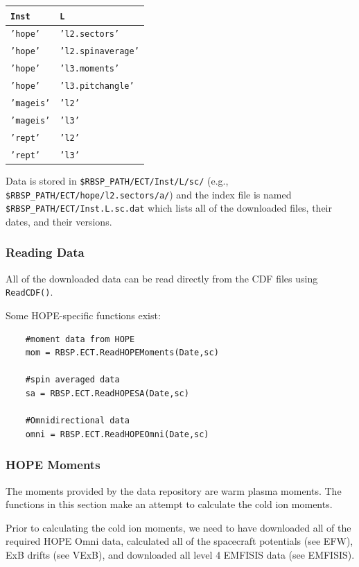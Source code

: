 	\begin{tabular}{|l|l|}
	\hline
	\texttt{Inst} & \texttt{L} \\
	\hline
	\texttt{'hope'} & \texttt{'l2.sectors'} \\
	\texttt{'hope'} & \texttt{'l2.spinaverage'} \\
	\texttt{'hope'} & \texttt{'l3.moments'} \\
	\texttt{'hope'} & \texttt{'l3.pitchangle'} \\
	\texttt{'mageis'} & \texttt{'l2'} \\
	\texttt{'mageis'} & \texttt{'l3'} \\
	\texttt{'rept'} & \texttt{'l2'} \\
	\texttt{'rept'} & \texttt{'l3'} \\
	\hline
	\end{tabular}
	
	Data is stored in \texttt{\$RBSP\_PATH/ECT/Inst/L/sc/} (e.g., \texttt{\$RBSP\_PATH/ECT/hope/l2.sectors/a/}) and the index file is named \texttt{\$RBSP\_PATH/ECT/Inst.L.sc.dat} which lists all of the downloaded files, their dates, and their versions.
	
	\subsubsection{Reading Data}
	
	All of the downloaded data can be read directly from the CDF files using \texttt{ReadCDF()}.
	
	Some HOPE-specific functions exist:
	
	\begin{verbatim}
	#moment data from HOPE
	mom = RBSP.ECT.ReadHOPEMoments(Date,sc)
	
	#spin averaged data
	sa = RBSP.ECT.ReadHOPESA(Date,sc)
	
	#Omnidirectional data
	omni = RBSP.ECT.ReadHOPEOmni(Date,sc)
	\end{verbatim}
	
	\subsubsection{HOPE Moments}
	
	The moments provided by the data repository are warm plasma moments. The functions in this section make an attempt to calculate the cold ion moments.
	
	Prior to calculating the cold ion moments, we need to have downloaded all of the required HOPE Omni data, calculated all of the spacecraft potentials (see EFW), ExB drifts (see VExB), and downloaded all level 4 EMFISIS data (see EMFISIS).
	
